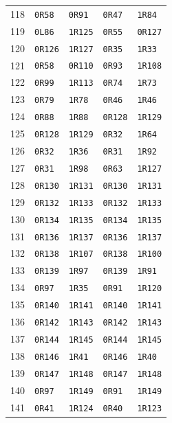 {\begin{longtable}{rllll}
118 & \texttt{0R58} & \texttt{0R91} & \texttt{0R47} & \texttt{1R84}\\
119 & \texttt{0L86} & \texttt{1R125} & \texttt{0R55} & \texttt{0R127}\\
120 & \texttt{0R126} & \texttt{1R127} & \texttt{0R35} & \texttt{1R33}\\
121 & \texttt{0R58} & \texttt{0R110} & \texttt{0R93} & \texttt{1R108}\\
122 & \texttt{0R99} & \texttt{1R113} & \texttt{0R74} & \texttt{1R73}\\
123 & \texttt{0R79} & \texttt{1R78} & \texttt{0R46} & \texttt{1R46}\\
124 & \texttt{0R88} & \texttt{1R88} & \texttt{0R128} & \texttt{1R129}\\
125 & \texttt{0R128} & \texttt{1R129} & \texttt{0R32} & \texttt{1R64}\\
126 & \texttt{0R32} & \texttt{1R36} & \texttt{0R31} & \texttt{1R92}\\
127 & \texttt{0R31} & \texttt{1R98} & \texttt{0R63} & \texttt{1R127}\\
128 & \texttt{0R130} & \texttt{1R131} & \texttt{0R130} & \texttt{1R131}\\
129 & \texttt{0R132} & \texttt{1R133} & \texttt{0R132} & \texttt{1R133}\\
130 & \texttt{0R134} & \texttt{1R135} & \texttt{0R134} & \texttt{1R135}\\
131 & \texttt{0R136} & \texttt{1R137} & \texttt{0R136} & \texttt{1R137}\\
132 & \texttt{0R138} & \texttt{1R107} & \texttt{0R138} & \texttt{1R100}\\
133 & \texttt{0R139} & \texttt{1R97} & \texttt{0R139} & \texttt{1R91}\\
134 & \texttt{0R97} & \texttt{1R35} & \texttt{0R91} & \texttt{1R120}\\
135 & \texttt{0R140} & \texttt{1R141} & \texttt{0R140} & \texttt{1R141}\\
136 & \texttt{0R142} & \texttt{1R143} & \texttt{0R142} & \texttt{1R143}\\
137 & \texttt{0R144} & \texttt{1R145} & \texttt{0R144} & \texttt{1R145}\\
138 & \texttt{0R146} & \texttt{1R41} & \texttt{0R146} & \texttt{1R40}\\
139 & \texttt{0R147} & \texttt{1R148} & \texttt{0R147} & \texttt{1R148}\\
140 & \texttt{0R97} & \texttt{1R149} & \texttt{0R91} & \texttt{1R149}\\
141 & \texttt{0R41} & \texttt{1R124} & \texttt{0R40} & \texttt{1R123}\\

\end{longtable}}
